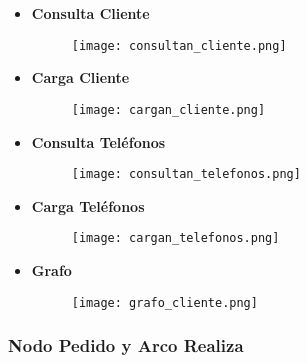 \documentclass[a4paper]{article}
\begin{document}
\begin{itemize}

    \item \textbf{\large{Consulta Cliente}}

    \begin{figure}[H]
        \centering
        \texttt{[image: consultan\_cliente.png]}
        \label{fig:consultan_cliente}
    \end{figure}

    \item \textbf{\large{Carga Cliente}}

    \begin{figure}[H]
        \centering
        \texttt{[image: cargan\_cliente.png]}
        \label{fig:cargan_cliente}
    \end{figure}

    \item \textbf{\large{Consulta Teléfonos}}

    \begin{figure}[H]
        \centering
        \texttt{[image: consultan\_telefonos.png]}
        \label{fig:consultan_telefonos}
    \end{figure}

\newpage

    \item \textbf{\large{Carga Teléfonos}}

    \begin{figure}[H]
        \centering
        \texttt{[image: cargan\_telefonos.png]}
        \label{fig:cargan_telefonos}
    \end{figure}

    \item \textbf{\large{Grafo}}

    \begin{figure}[H]
        \centering
        \texttt{[image: grafo\_cliente.png]}
        \label{fig:grafo_cliente}
    \end{figure}

\end{itemize}

\subsubsection{\Large{Nodo Pedido y Arco Realiza}}
\end{document}
